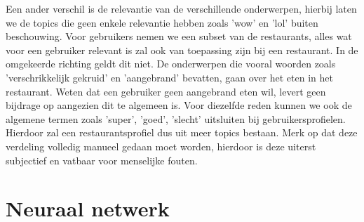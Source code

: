 Een ander verschil is de relevantie van de verschillende onderwerpen, hierbij laten we de topics die geen enkele relevantie hebben zoals 'wow' en 'lol' buiten beschouwing. Voor gebruikers nemen we een subset van de restaurants, alles wat voor een gebruiker relevant is zal ook van toepassing zijn bij een restaurant. In de omgekeerde richting geldt dit niet. De onderwerpen die vooral woorden zoals 'verschrikkelijk gekruid' en 'aangebrand' bevatten, gaan over het eten in het restaurant. Weten dat een gebruiker geen aangebrand eten wil, levert geen bijdrage op aangezien dit te algemeen is. Voor diezelfde reden kunnen we ook de algemene termen zoals 'super', 'goed', 'slecht' uitsluiten bij gebruikersprofielen. Hierdoor zal een restaurantsprofiel dus uit meer topics bestaan. Merk op dat deze verdeling volledig manueel gedaan moet worden, hierdoor is deze uiterst subjectief en vatbaar voor menselijke fouten.


























































\section{Neuraal netwerk}
\label{sec:chapt4_neuraal_netwerk}

